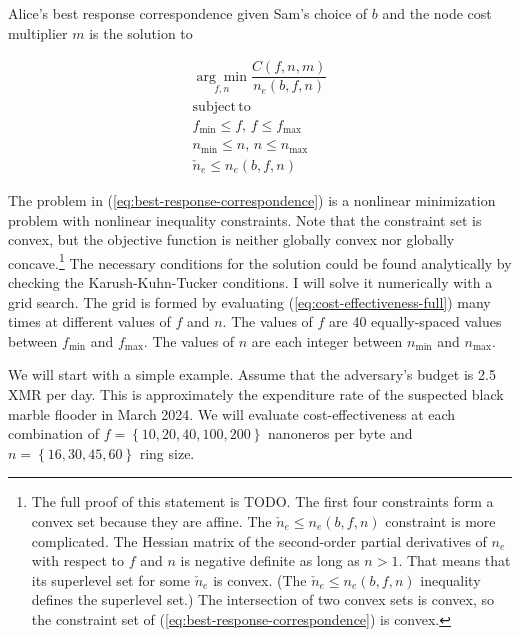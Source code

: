 \documentclass[english]{article}
\begin{document}
Alice's best response correspondence given Sam's choice of $b$ and
the node cost multiplier $m$ is the solution to

\begin{equation}
\begin{array}{l}
\underset{f,n}{\arg\min}\dfrac{C\left(f,n,m\right)}{n_{e}\left(b,f,n\right)}\\
\mathrm{subject\,to}\\
f_{\min}\leq f,\,f\leq f_{\max}\\
n_{\min}\leq n,\,n\leq n_{\max}\\
\check{n}_{e}\leq n_{e}\left(b,f,n\right)
\end{array}\label{eq:best-response-correspondence}
\end{equation}

The problem in (\ref{eq:best-response-correspondence}) is a nonlinear
minimization problem with nonlinear inequality constraints. Note that
the constraint set is convex, but the objective function is neither
globally convex nor globally concave.\footnote{The full proof of this statement is TODO. The first four constraints
form a convex set because they are affine. The $\check{n}_{e}\leq n_{e}\left(b,f,n\right)$
constraint is more complicated. The Hessian matrix of the second-order
partial derivatives of $n_{e}$ with respect to $f$ and $n$ is negative
definite as long as $n>1$. That means that its superlevel set for
some $\check{n}_{e}$ is convex. (The $\check{n}_{e}\leq n_{e}\left(b,f,n\right)$
inequality defines the superlevel set.) The intersection of two convex
sets is convex, so the constraint set of (\ref{eq:best-response-correspondence})
is convex.} The necessary conditions for the solution could be found analytically
by checking the Karush-Kuhn-Tucker conditions. I will solve it numerically
with a grid search. The grid is formed by evaluating (\ref{eq:cost-effectiveness-full})
many times at different values of $f$ and $n$. The values of $f$
are 40 equally-spaced values between $f_{\min}$ and $f_{\max}$.
The values of $n$ are each integer between $n_{\min}$ and $n_{\max}$.

We will start with a simple example. Assume that the adversary's budget
is 2.5 XMR per day. This is approximately the expenditure rate of
the suspected black marble flooder in March 2024. We will evaluate
cost-effectiveness at each combination of $f=\left\{ 10,20,40,100,200\right\} $
nanoneros per byte and $n=\left\{ 16,30,45,60\right\} $ ring size.
\end{document}
